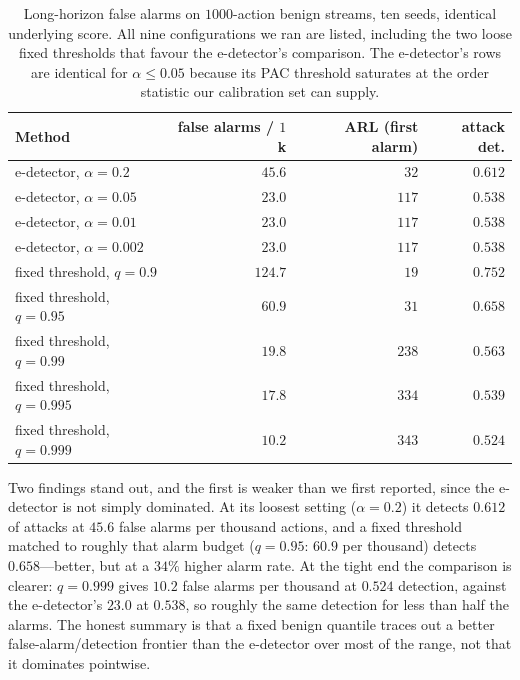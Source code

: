 \documentclass[pdflatex,sn-basic]{sn-jnl}%
\theoremstyle{thmstyleone}
\theoremstyle{thmstyletwo}
\theoremstyle{thmstylethree}
\begin{document}
\begin{table}[htbp]
\centering
\caption{Long-horizon false alarms on $1000$-action benign streams, ten seeds,
identical underlying score. All nine configurations we ran are listed, including
the two loose fixed thresholds that favour the e-detector's comparison. The
e-detector's rows are identical for $\alpha \le 0.05$ because its PAC threshold
saturates at the order statistic our calibration set can supply.}
\label{tab:longhorizon}
\small
\begin{tabular}{@{}lrrr@{}}
\toprule
Method & false alarms / $1$k & ARL (first alarm) & attack det. \\
\midrule
e-detector, $\alpha=0.2$ & $45.6$ & $32$ & $0.612$ \\
e-detector, $\alpha=0.05$ & $23.0$ & $117$ & $0.538$ \\
e-detector, $\alpha=0.01$ & $23.0$ & $117$ & $0.538$ \\
e-detector, $\alpha=0.002$ & $23.0$ & $117$ & $0.538$ \\
fixed threshold, $q=0.9$ & $124.7$ & $19$ & $0.752$ \\
fixed threshold, $q=0.95$ & $60.9$ & $31$ & $0.658$ \\
fixed threshold, $q=0.99$ & $19.8$ & $238$ & $0.563$ \\
fixed threshold, $q=0.995$ & $17.8$ & $334$ & $0.539$ \\
fixed threshold, $q=0.999$ & $10.2$ & $343$ & $0.524$ \\
\bottomrule
\end{tabular}
\end{table}

Two findings stand out, and the first is weaker than we first reported, since the
e-detector is not simply dominated. At its loosest setting ($\alpha = 0.2$) it
detects $0.612$ of attacks at $45.6$ false alarms per thousand actions, and a fixed
threshold matched to roughly that alarm budget ($q = 0.95$: $60.9$ per thousand)
detects $0.658$---better, but at a $34\%$ higher alarm rate. At the tight end the
comparison is clearer: $q = 0.999$ gives $10.2$ false alarms per thousand at
$0.524$ detection, against the e-detector's $23.0$ at $0.538$, so roughly the same
detection for less than half the alarms. The honest summary is that a fixed benign
quantile traces out a better false-alarm/detection frontier than the e-detector
over most of the range, not that it dominates pointwise.
\end{document}
